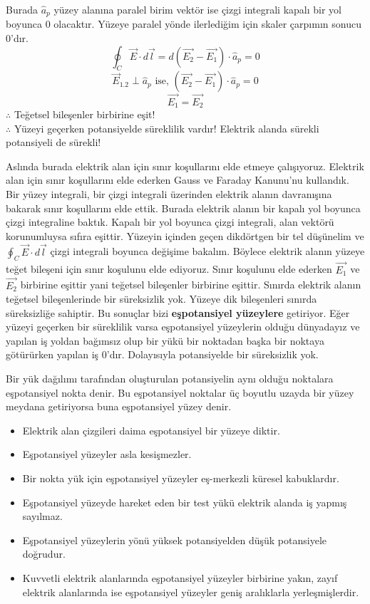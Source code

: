 \begin{theorem}

Burada $\hat{a}_{p}$ yüzey alanına paralel birim vektör ise çizgi integrali kapalı bir yol boyunca $0$ olacaktır. Yüzeye paralel yönde ilerlediğim için skaler çarpımın sonucu $0$'dır.
\[ \oint_{C} \Vec{E} \cdot d\Vec{l} = d (\Vec{E_{2}} -  \Vec{E_{1}}) \cdot \hat{a}_{p} = 0 \]
\[ \Vec{E}_{1.2} \perp \hat{a}_{p} \textrm{ ise, } (\Vec{E_{2}} -  \Vec{E_{1}}) \cdot \hat{a}_{p} = 0 \]
\[ \Vec{E_{1}} = \Vec{E_{2}} \]
$\therefore$ Teğetsel bileşenler birbirine eşit!\\
$\therefore$ Yüzeyi geçerken potansiyelde süreklilik vardır!
Elektrik alanda sürekli potansiyeli de sürekli!
\begin{note}
    Aslında burada elektrik alan için sınır koşullarını elde etmeye çalışıyoruz. Elektrik alan için sınır koşullarını elde ederken Gauss ve Faraday Kanunu'nu kullandık. Bir yüzey integrali, bir çizgi integrali üzerinden elektrik alanın davranışına bakarak sınır koşullarını elde ettik. Burada elektrik alanın bir kapalı yol boyunca çizgi integraline baktık. Kapalı bir yol boyunca çizgi integrali, alan vektörü korunumluysa sıfıra eşittir. Yüzeyin içinden geçen dikdörtgen bir tel düşünelim ve $ \oint_{C} \Vec{E} \cdot d\Vec{l}$ çizgi integrali boyunca değişime bakalım. Böylece elektrik alanın yüzeye teğet bileşeni için sınır koşulunu elde ediyoruz. Sınır koşulunu elde ederken $\Vec{E_{1}}$ ve $\Vec{E_{2}}$ birbirine eşittir yani teğetsel bileşenler birbirine eşittir. Sınırda elektrik alanın teğetsel bileşenlerinde bir süreksizlik yok. Yüzeye dik bileşenleri sınırda süreksizliğe sahiptir. Bu sonuçlar bizi \textbf{eşpotansiyel yüzeylere} getiriyor. Eğer yüzeyi geçerken bir süreklilik varsa eşpotansiyel yüzeylerin olduğu dünyadayız ve yapılan iş yoldan bağımsız olup bir yükü bir noktadan başka bir noktaya götürürken yapılan iş $0$'dır. Dolayısıyla potansiyelde bir süreksizlik  yok.
\end{note}
\end{theorem}
\begin{definition}
Bir yük dağılımı tarafından oluşturulan potansiyelin aynı olduğu noktalara eşpotansiyel nokta denir. Bu eşpotansiyel noktalar üç boyutlu uzayda bir yüzey meydana getiriyorsa buna eşpotansiyel yüzey denir.
\begin{itemize}
\item Elektrik alan çizgileri daima eşpotansiyel bir yüzeye diktir.
\item Eşpotansiyel yüzeyler asla kesişmezler.
\item Bir nokta yük için eşpotansiyel yüzeyler eş-merkezli küresel kabuklardır.
\item Eşpotansiyel yüzeyde hareket eden bir test yükü elektrik alanda iş yapmış sayılmaz.
\item Eşpotansiyel yüzeylerin yönü yüksek potansiyelden düşük potansiyele doğrudur.
\item Kuvvetli elektrik alanlarında eşpotansiyel yüzeyler birbirine yakın, zayıf elektrik
alanlarında ise eşpotansiyel yüzeyler geniş aralıklarla yerleşmişlerdir.
\end{itemize}
\end{definition}
